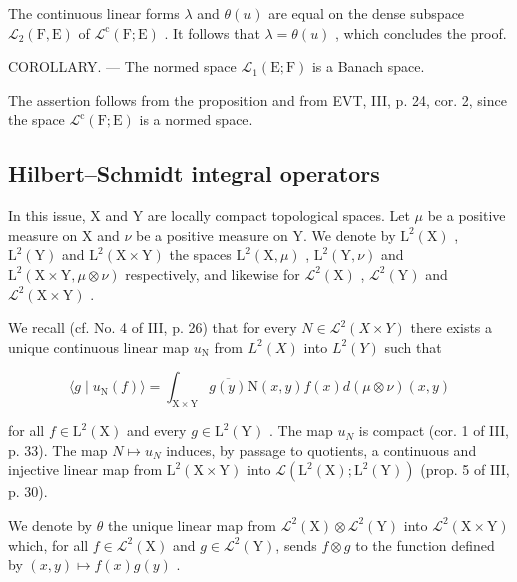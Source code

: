 The continuous linear forms \(\lambda\) and \(\theta(u)\) are equal on the dense subspace \(\mathcal{L}_{2}(\mathrm{F},\mathrm{E})\) of \(\mathcal{L}^{\mathrm{c}}(\mathrm{F};\mathrm{E})\) . It follows that \(\lambda=\theta(u)\) , which concludes the proof.

COROLLARY. --- The normed space \(\mathcal{L}_{1}(\mathrm{E};\mathrm{F})\) is a Banach space.

The assertion follows from the proposition and from EVT, III, p. 24, cor. 2, since the space \(\mathcal{L}^{\mathrm{c}}(\mathrm{F};\mathrm{E})\) is a normed space.

\subsection{Hilbert--Schmidt integral operators}

In this issue, X and Y are locally compact topological spaces. Let \(\mu\) be a positive measure on X and \(\nu\) be a positive measure on Y. We denote by \(\mathrm{L}^{2}(\mathrm{X})\) , \(\mathrm{L}^{2}(\mathrm{Y})\) and \(\mathrm{L}^{2}(\mathrm{X} \times \mathrm{Y})\) the spaces \(\mathrm{L}^{2}(\mathrm{X}, \mu)\) , \(\mathrm{L}^{2}(\mathrm{Y}, \nu)\) and \(\mathrm{L}^{2}(\mathrm{X} \times \mathrm{Y}, \mu \otimes \nu)\) respectively, and likewise for \(\mathcal{L}^{2}(\mathrm{X})\) , \(\mathcal{L}^{2}(\mathrm{Y})\) and \(\mathcal{L}^{2}(\mathrm{X} \times \mathrm{Y})\) .

We recall (cf. No. 4 of III, p. 26) that for every \(N \in \mathcal{L}^{2}(X \times Y)\) there exists a unique continuous linear map \(u_{\mathrm{N}}\) from \(L^{2}(X)\) into \(L^{2}(Y)\) such that

\[
\langle g \mid u _ {\mathrm{N}} (f) \rangle = \int_ {\mathrm{X} \times \mathrm{Y}} \overline {{g (y)}} \mathrm{N} (x, y) f (x) d (\mu \otimes \nu) (x, y)\tag{12}
\]

for all \(f \in \mathrm{L}^{2}(\mathrm{X})\) and every \(g \in \mathrm{L}^{2}(\mathrm{Y})\) . The map \(u_{N}\) is compact (cor. 1 of III, p. 33). The map \(N \mapsto u_{N}\) induces, by passage to quotients, a continuous and injective linear map from \(\mathrm{L}^{2}(\mathrm{X} \times \mathrm{Y})\) into \(\mathcal{L}(\mathrm{L}^{2}(\mathrm{X});\mathrm{L}^{2}(\mathrm{Y}))\) (prop. 5 of III, p. 30).

We denote by \(\theta\) the unique linear map from \(\mathcal{L}^2 (\mathrm{X})\otimes \mathcal{L}^2 (\mathrm{Y})\) into \(\mathcal{L}^2 (\mathrm{X}\times \mathrm{Y})\) which, for all \(f\in \mathcal{L}^2 (\mathrm{X})\) and \(g\in \mathcal{L}^2 (\mathrm{Y})\), sends \(f\otimes g\) to the function defined by \((x,y)\mapsto f(x)g(y)\) .

